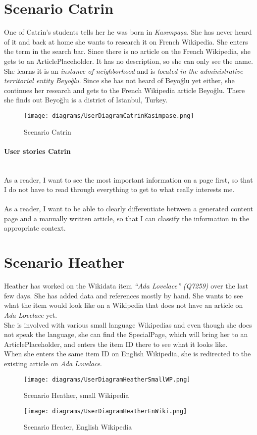 \section{Scenario Catrin}
One of Catrin's students tells her he was born in \textit{Kasımpaşa}. She has never heard of it and back at home she wants to research it on French Wikipedia. She enters the term in the search bar. Since there is no article on the French Wikipedia, she gets to an ArticlePlaceholder. It has no description, so she can only see the name. She learns it is an \textit{instance of neighborhood} and is \textit{located in the administrative territorial entity Beyoğlu}. Since she has not heard of Beyoğlu yet either, she continues her research and gets to the French Wikipedia article Beyoğlu. There she finds out Beyoğlu is a district of Istanbul, Turkey.
\begin{figure}[H]
	\centering
	\texttt{[image: diagrams/UserDiagramCatrinKasimpase.png]}
	\caption{Scenario Catrin}
	\label{fig:ScenarioCartin}
\end{figure}

\paragraph{User stories Catrin} ~\\
As a reader, I want to see the most important information on a page first, so that I do not have to read through everything to get to what really interests me. \\
\\
As a reader, I want to be able to clearly differentiate between a generated content page and a manually written article, so that I can classify the information in the appropriate context.

\section{Scenario Heather}
Heather has worked on the Wikidata item \textit{``Ada Lovelace'' (Q7259)} over the last few days. She has added data and references mostly by hand. She wants to see what the item would look like on a Wikipedia that does not have an article on \textit{Ada Lovelace} yet. \\
She is involved with various small language Wikipedias and even though she does not speak the language, she can find the SpecialPage, which will bring her to an ArticlePlaceholder, and enters the item ID there to see what it looks like. \\
When she enters the same item ID on English Wikipedia, she is redirected to the existing article on \textit{Ada Lovelace}.
\begin{figure}[H]
	\centering
	\texttt{[image: diagrams/UserDiagramHeatherSmallWP.png]}
	\caption{Scenario Heather, small Wikipedia}
	\label{fig:ScenarioHeatherSmall}
\end{figure}
\begin{figure}[H]
	\centering
	\texttt{[image: diagrams/UserDiagramHeatherEnWiki.png]}
	\caption{Scenario Heater, English Wikipedia}
	\label{fig:ScenarioHeatherEnWiki}
\end{figure}

